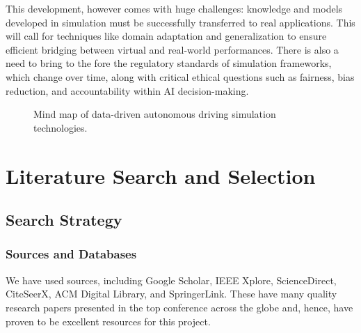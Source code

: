 \documentclass[lettersize,journal]{IEEEtran}
\begin{document}
This development, however comes with huge challenges: knowledge and models developed in simulation must be successfully transferred to real applications. This will call for techniques like domain adaptation and generalization to ensure efficient bridging between virtual and real-world performances. There is also a need to bring to the fore the regulatory standards of simulation frameworks, which change over time, along with critical ethical questions such as fairness, bias reduction, and accountability within AI decision-making.


\begin{figure}[h]
    \centering
    \caption{Mind map of data-driven autonomous driving simulation technologies.}
    \label{fig:mindmap}
\end{figure}

\section{Literature Search and Selection}
\subsection{Search Strategy}
\subsubsection{Sources and Databases}
We have used sources, including Google Scholar, IEEE Xplore, ScienceDirect, CiteSeerX, ACM Digital Library, and SpringerLink. These have many quality research papers presented in the top conference across the globe and, hence, have proven to be excellent resources for this project.
\end{document}
